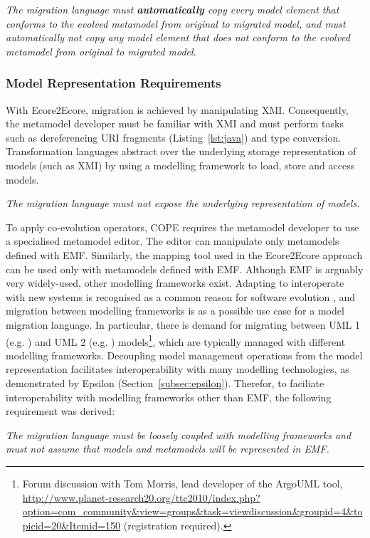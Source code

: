 \emph{The migration language must \textbf{automatically} copy every model element that conforms to the evolved metamodel from original to migrated model, and must automatically not copy any model element that does not conform to the evolved metamodel from original to migrated model.}


\subsubsection{Model Representation Requirements}
With Ecore2Ecore, migration is achieved by manipulating XMI. Consequently, the metamodel developer must be familiar with XMI and must perform tasks such as dereferencing URI fragments (Listing~\ref{lst:java}) and type conversion. Transformation languages abstract over the underlying storage representation of models (such as XMI) by using a modelling framework to load, store and access models.

\emph{The migration language must not expose the underlying representation of models.}

\vspace{5mm}

To apply co-evolution operators, COPE requires the metamodel developer to use a specialised metamodel editor. The editor can manipulate only metamodels defined with EMF. Similarly, the mapping tool used in the Ecore2Ecore approach can be used only with metamodels defined with EMF. Although EMF is arguably very widely-used, other modelling frameworks exist. Adapting to interoperate with new systems is recognised as a common reason for software evolution \cite{sjoberg93quantifying}, and migration between modelling frameworks is as a possible use case for a model migration language. In particular, there is demand for migrating between UML 1 (e.g. \cite{uml14}) and UML 2 (e.g. \cite{uml22}) models\footnote{Forum discussion with Tom Morris, lead developer of the ArgoUML tool, \url{http://www.planet-research20.org/ttc2010/index.php?option=com_community&view=groups&task=viewdiscussion&groupid=4&topicid=20&Itemid=150} (registration required).}, which are typically managed with different modelling frameworks. Decoupling model management operations from the model representation facilitates interoperability with many modelling technologies, as demonstrated by Epsilon (Section~\ref{subsec:epsilon}). Therefor, to faciliate interoperability with modelling frameworks other than EMF, the following requirement was derived:

\emph{The migration language must be loosely coupled with modelling frameworks and must not assume that models and metamodels will be represented in EMF.}
